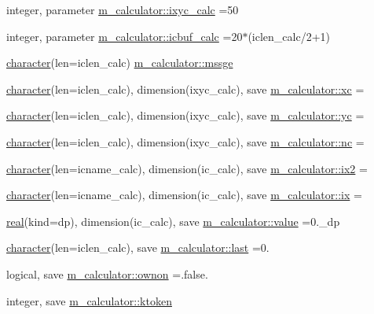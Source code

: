 \begin{DoxyCompactItemize}
\item 
integer, parameter \hyperlink{namespacem__calculator_a7f11fbca3121837187391693c8bf3f01}{m\+\_\+calculator\+::ixyc\+\_\+calc} =50
\item 
integer, parameter \hyperlink{namespacem__calculator_ae948e91eea8ea15aabe598f464ca80da}{m\+\_\+calculator\+::icbuf\+\_\+calc} =20$\ast$(iclen\+\_\+calc/2+1)
\item 
\hyperlink{option__stopwatch_83_8txt_abd4b21fbbd175834027b5224bfe97e66}{character}(len=iclen\+\_\+calc) \hyperlink{namespacem__calculator_ac160bf2b4ddbb768c89d08f21e2ddbad}{m\+\_\+calculator\+::mssge}
\item 
\hyperlink{option__stopwatch_83_8txt_abd4b21fbbd175834027b5224bfe97e66}{character}(len=iclen\+\_\+calc), dimension(ixyc\+\_\+calc), save \hyperlink{namespacem__calculator_ab41188894b08fea788b696585426ae6b}{m\+\_\+calculator\+::xc} =\textquotesingle{} \textquotesingle{}
\item 
\hyperlink{option__stopwatch_83_8txt_abd4b21fbbd175834027b5224bfe97e66}{character}(len=iclen\+\_\+calc), dimension(ixyc\+\_\+calc), save \hyperlink{namespacem__calculator_a8ce138d24e6b41a29b5b6cec70e78086}{m\+\_\+calculator\+::yc} =\textquotesingle{} \textquotesingle{}
\item 
\hyperlink{option__stopwatch_83_8txt_abd4b21fbbd175834027b5224bfe97e66}{character}(len=iclen\+\_\+calc), dimension(ixyc\+\_\+calc), save \hyperlink{namespacem__calculator_a2ba30f3ed633dcbb2d8deeb54f8a450b}{m\+\_\+calculator\+::nc} =\textquotesingle{} \textquotesingle{}
\item 
\hyperlink{option__stopwatch_83_8txt_abd4b21fbbd175834027b5224bfe97e66}{character}(len=icname\+\_\+calc), dimension(ic\+\_\+calc), save \hyperlink{namespacem__calculator_a1d671e939e22b8530ef0cd575bf7dd04}{m\+\_\+calculator\+::ix2} =\textquotesingle{} \textquotesingle{}
\item 
\hyperlink{option__stopwatch_83_8txt_abd4b21fbbd175834027b5224bfe97e66}{character}(len=icname\+\_\+calc), dimension(ic\+\_\+calc), save \hyperlink{namespacem__calculator_a7570d0ed10f0fc80eeaf3b07ef39c370}{m\+\_\+calculator\+::ix} =\textquotesingle{} \textquotesingle{}
\item 
\hyperlink{read__watch_83_8txt_abdb62bde002f38ef75f810d3a905a823}{real}(kind=dp), dimension(ic\+\_\+calc), save \hyperlink{namespacem__calculator_aeaff519ae0f18ac99095c955fbe12f9d}{m\+\_\+calculator\+::value} =0.\+\_\+dp
\item 
\hyperlink{option__stopwatch_83_8txt_abd4b21fbbd175834027b5224bfe97e66}{character}(len=iclen\+\_\+calc), save \hyperlink{namespacem__calculator_a5d0147576a419edafaabfc5d7f1317fc}{m\+\_\+calculator\+::last} =\textquotesingle{}0.\textquotesingle{}
\item 
logical, save \hyperlink{namespacem__calculator_a64ba59ad27c2751b72b5880500985b56}{m\+\_\+calculator\+::ownon} =.false.
\item 
integer, save \hyperlink{namespacem__calculator_ada86fed286e7bff1456862ab8b5bde47}{m\+\_\+calculator\+::ktoken}
\end{DoxyCompactItemize}
